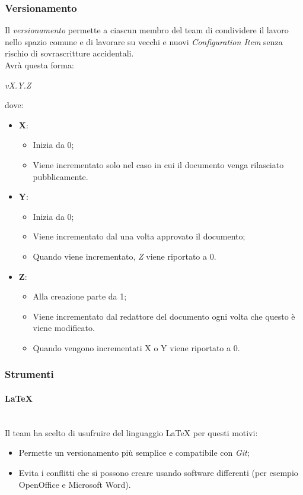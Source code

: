 	\subsubsection{Versionamento}
	Il \emph{versionamento} permette a ciascun membro del team di condividere il lavoro nello spazio comune e di lavorare su vecchi e nuovi \emph{Configuration Item} senza rischio di sovrascritture accidentali.
	\\Avrà questa forma:
	\begin{center}
		\emph{vX.Y.Z}
	\end{center}
	dove:
	\begin{itemize}
		\item \textbf{X}:
		\begin{itemize}
			\item Inizia da 0;
			\item Viene incrementato solo nel caso in cui il documento venga rilasciato pubblicamente.
		\end{itemize}
		\item \textbf{Y}:
		\begin{itemize}
			\item Inizia da 0;
			\item Viene incrementato dal \RdP{} una volta approvato il documento;
			\item Quando viene incrementato, \emph{Z} viene riportato a 0.
		\end{itemize}
		\item \textbf{Z}:
		\begin{itemize}
			\item Alla creazione parte da 1;
			\item Viene incrementato dal redattore del documento ogni volta che questo è viene modificato.
			\item Quando vengono incrementati X o Y viene riportato a 0.
		\end{itemize}
	\end{itemize}
	\subsubsection{Strumenti}
			\paragraph{\LaTeX}
			~\\Il team ha scelto di usufruire del linguaggio \LaTeX{} per questi motivi:
			\begin{itemize}
				\item Permette un versionamento più semplice e compatibile con \emph{Git};
				\item Evita i conflitti che si possono creare usando software differenti (per esempio OpenOffice e Microsoft Word).
			\end{itemize}
		
